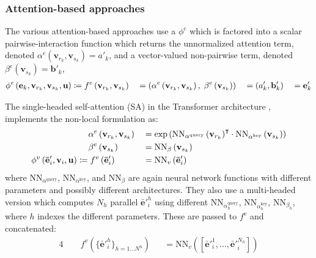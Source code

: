 \subsubsection*{Attention-based approaches}
The various attention-based approaches use a $\phi^e$ which is factored into a scalar pairwise-interaction function which returns the unnormalized attention term, denoted  $\alpha^e\left(\mathbf{v}_{r_k}, \mathbf{v}_{s_k}\right) = a'_k$, and a vector-valued non-pairwise term, denoted $\beta^e\left(\mathbf{v}_{s_k}\right) = \mathbf{b}'_k$,
\begin{alignat*}{4}
\phi^e\left(\mathbf{e}_k, \mathbf{v}_{r_k}, \mathbf{v}_{s_k}, \mathbf{u}\right) &\coloneqq f^e\left(\mathbf{v}_{r_k}, \mathbf{v}_{s_k}\right) &&= \left( \alpha^e\left(\mathbf{v}_{r_k}, \mathbf{v}_{s_k}\right), \; \beta^e\left(\mathbf{v}_{s_k}\right) \right) &&= (a'_k, \mathbf{b}'_k) &&= \mathbf{e}'_k \\
\end{alignat*}

The single-headed self-attention (SA) in the Transformer architecture  \citep{vaswani2017attention}, implements the non-local formulation as:
\begin{alignat*}{4}
&\phantom{{}={}} \alpha^e\left(\mathbf{v}_{r_k}, \mathbf{v}_{s_k}\right) &&= \exp\left(\mathrm{NN}_{\alpha^\mathrm{query}}\left(\mathbf{v}_{r_k}\right)^\intercal \cdot \mathrm{NN}_{\alpha^\mathrm{key}} \left(\mathbf{v}_{s_k}\right)\right) \\
&\phantom{{}={}} \beta^e\left(\mathbf{v}_{s_k}\right) &&= \mathrm{NN}_\beta \left(\mathbf{v}_{s_k}\right) \\
\phi^v\left(\mathbf{\bar{e}}'_i, \mathbf{v}_i, \globals\right) &\coloneqq f^v\left(\mathbf{\bar{e}}'_i\right) &&= \mathrm{NN}_v \left(\mathbf{\bar{e}}'_i\right)
\end{alignat*}
where $\mathrm{NN}_{\alpha^{\mathrm{query}}}$, $\mathrm{NN}_{\alpha^\mathrm{key}}$, and $\mathrm{NN}_{\beta}$ are again neural network functions with different parameters and possibly different architectures.
They also use a multi-headed version which computes $N_h$ parallel $\mathbf{\bar{e}}'^h_i$ using different $\mathrm{NN}_{\alpha^\mathrm{query}_h}$, $\mathrm{NN}_{\alpha^\mathrm{key}_h}$, $\mathrm{NN}_{\beta_h}$, where $h$ indexes the different parameters. These are passed to $f^v$ and concatenated:
\begin{alignat*}{4}
&\quad\ f^v\left(\{\mathbf{\bar{e}}'^h_i\}_{h=1\dots N^h}\right) &&= \mathrm{NN}_v \left([\mathbf{\bar{e}}'^1_i, \dots, \mathbf{\bar{e}}'^{N_h}_i]\right)
\end{alignat*}

